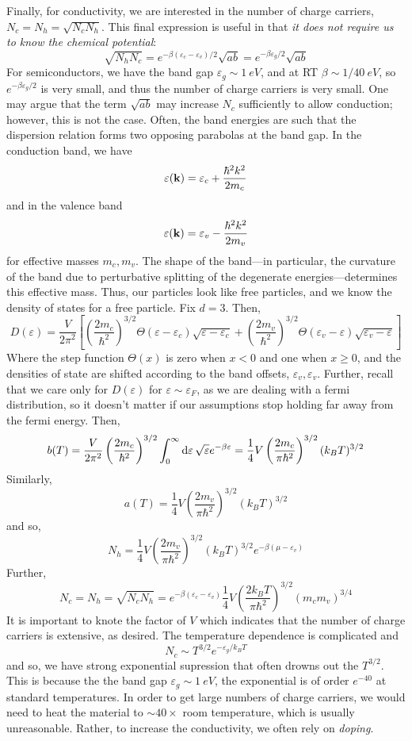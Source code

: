 Finally, for conductivity, we are interested in the number of charge carriers, \(N_c = N_h = \sqrt{N_cN_h}\). This final expression is useful in that \emph{it does not require us to know the chemical potential}:
\[\sqrt{N_hN_c} = e^{-\beta(\varepsilon_c-\varepsilon_v)/2}\sqrt{ab} = e^{-\beta \varepsilon_g/2}\sqrt{ab}\]
For semiconductors, we have the band gap \(\varepsilon_g\sim \SI{1}{eV}\), and at RT \(\beta\sim 1/\SI{40}{eV}\), so \(e^{-\beta\varepsilon_g/2}\) is very small, and thus the number of charge carriers is very small. One may argue that the term \(\sqrt{ab}\) may increase \(N_c\) sufficiently to allow conduction; however, this is not the case. Often, the band energies are such that the dispersion relation forms two opposing parabolas at the band gap. In the conduction band, we have
\[\varepsilon(\mathbf{k}) = \varepsilon_c + \frac{\hbar^2 k^2}{2m_c}\]
and in the valence band
\[\varepsilon(\mathbf{k}) = \varepsilon_v - \frac{\hbar^2 k^2}{2m_v}\]
for effective masses \(m_c, m_v\). The shape of the band---in particular, the curvature of the band due to perturbative splitting of the degenerate energies---determines this effective mass. Thus, our particles look like free particles, and we know the density of states for a free particle. Fix \(d=3\). Then,
\[D(\varepsilon) = \frac{V}{2\pi^2}\left[ \left(\frac{2m_c}{\hbar^2}\right)^{3/2}\Theta(\varepsilon-\varepsilon_c)\sqrt{\varepsilon-\varepsilon_c} +\left(\frac{2m_v}{\hbar^2}\right)^{3/2}\Theta(\varepsilon_v-\varepsilon)\sqrt{\varepsilon_v-\varepsilon}\right]\]
Where the step function \(\Theta(x)\) is zero when \(x<0\) and one when \(x\geq 0\), and the densities of state are shifted according to the band offsets, \(\varepsilon_v,\varepsilon_v\). Further, recall that we care only for \(D(\varepsilon)\) for \(\varepsilon \sim\varepsilon_F\), as we are dealing with a fermi distribution, so it doesn't matter if our assumptions stop holding far away from the fermi energy. Then,
\[b(T) = \frac{V}{2\pi^2}\left(\frac{2m_c}{\hbar^2}\right)^{3/2}\int_0^\infty\d{\varepsilon}\sqrt{\varepsilon}e^{-\beta\varepsilon} =\frac{1}{4}V\left(\frac{2m_c}{\pi\hbar^2}\right)^{3/2}(k_BT)^{3/2}\]
Similarly, 
\[a(T) = \frac{1}{4}V\left(\frac{2m_v}{\pi \hbar^2}\right)^{3/2}(k_BT)^{3/2}\]
and so,
\[N_h = \frac{1}{4}V\left(\frac{2m_v}{\pi \hbar^2}\right)^{3/2}(k_BT)^{3/2}e^{-\beta(\mu-\varepsilon_v)}\]
Further,
\[N_c =N_h = \sqrt{N_cN_h} = e^{-\beta(\varepsilon_c-\varepsilon_v)}\frac{1}{4}V\left(\frac{2k_BT}{\pi\hbar^2}\right)^{3/2}\left(m_cm_v\right)^{3/4}\]
It is important to knote the factor of \(V\) which indicates that the number of charge carriers is extensive, as desired. The temperature dependence is complicated and
\[N_c\sim T^{3/2}e^{-\varepsilon_g/k_BT}\]
and so, we have strong exponential supression that often drowns out the \(T^{3/2}\). This is because the the band gap \(\varepsilon_g\sim \SI{1}{eV}\), the exponential is of order \(e^{-40}\) at standard temperatures. In order to get large numbers of charge carriers, we would need to heat the material to \(\sim40\times\) room temperature, which is usually unreasonable. Rather, to increase the conductivity, we often rely on \emph{doping}.

